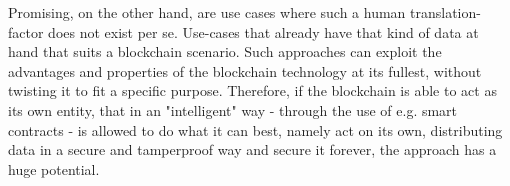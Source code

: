 Promising, on the other hand, are use cases where such a human translation-factor does not exist per se. Use-cases that already have that kind of data at hand that suits a blockchain scenario. Such approaches can exploit the advantages and properties of the blockchain technology at its fullest, without twisting it to fit a specific purpose.
Therefore, if the blockchain is able to act as its own entity, that in an "intelligent" way - through the use of e.g. smart contracts - is allowed to do what it can best, namely act on its own, distributing data in a secure and tamperproof way and secure it forever, the approach has a huge potential.

